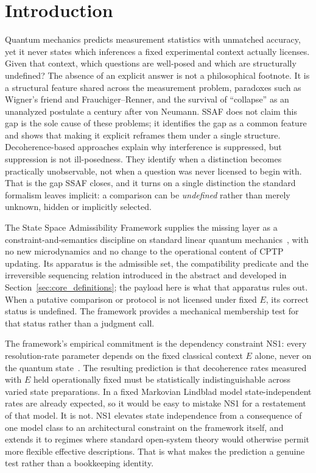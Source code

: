 \documentclass[aps,prx,onecolumn,11pt]{revtex4-2}
\theoremstyle{plain}
\theoremstyle{definition}
\theoremstyle{remark}
\begin{document}
\maketitle

\tableofcontents
\clearpage
\section{Introduction}
\label{sec:introduction}

Quantum mechanics predicts measurement statistics with unmatched
accuracy, yet it never states which inferences a fixed experimental
context actually licenses. Given that context, which questions are
well-posed and which are structurally undefined? The absence of an
explicit answer is not a philosophical footnote. It is a structural
feature shared across the measurement problem, paradoxes such as
Wigner's friend and Frauchiger--Renner, and the survival of
``collapse'' as an unanalyzed postulate a century after von Neumann.
SSAF does not claim this gap is the sole cause of these problems; it
identifies the gap as a common feature and shows that making it
explicit reframes them under a single structure. Decoherence-based
approaches explain why interference is suppressed, but suppression is
not ill-posedness. They identify when a distinction becomes practically
unobservable, not when a question was never licensed to begin with.
That is the gap SSAF closes, and it turns on a single distinction the
standard formalism leaves implicit: a comparison can be \emph{undefined}
rather than merely unknown, hidden or implicitly selected.

The State Space Admissibility Framework supplies the missing layer as a
constraint-and-semantics discipline on standard linear quantum
mechanics~\cite{Kraus1983,NielsenChuang2010,Watrous2018}, with no new
microdynamics and no change to the operational content of CPTP updating.
Its apparatus is the admissible set, the compatibility predicate and the
irreversible sequencing relation introduced in the abstract and
developed in Section~\ref{sec:core_definitions}; the payload here is what that
apparatus rules out. When a putative comparison or protocol is not
licensed under fixed $E$, its correct status is undefined. The framework
provides a mechanical membership test for that status rather than a
judgment call.

The framework's empirical commitment is the dependency constraint NS1:
every resolution-rate parameter depends on the fixed classical context
$E$ alone, never on the quantum state~\cite{Gisin1989,Gisin1990,Watrous2018}.
The resulting prediction is that decoherence rates measured with $E$
held operationally fixed must be statistically indistinguishable across
varied state preparations. In a fixed Markovian Lindblad model
state-independent rates are already expected, so it would be easy to
mistake NS1 for a restatement of that model. It is not. NS1 elevates
state independence from a consequence of one model class to an
architectural constraint on the framework itself, and extends it to
regimes where standard open-system theory would otherwise permit more
flexible effective descriptions. That is what makes the prediction a
genuine test rather than a bookkeeping identity.
\end{document}
